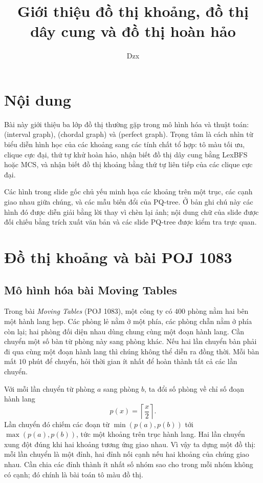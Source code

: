 \documentclass[11pt]{article}
\title{Giới thiệu đồ thị khoảng, đồ thị dây cung và đồ thị hoàn hảo}
\author{Dzx}
\date{}
\begin{document}
\maketitle


\section{Nội dung}

Bài này giới thiệu ba lớp đồ thị thường gặp trong mô hình hóa và thuật toán:
 (interval graph),  (chordal graph)
và  (perfect graph). Trọng tâm là cách nhìn từ biểu diễn
hình học của các khoảng sang các tính chất tổ hợp: tô màu tối ưu, clique cực
đại, thứ tự khử hoàn hảo, nhận biết đồ thị dây cung bằng LexBFS hoặc MCS, và
nhận biết đồ thị khoảng bằng thứ tự liên tiếp của các clique cực đại.

Các hình trong slide gốc chủ yếu minh họa các khoảng trên một trục, các cạnh
giao nhau giữa chúng, và các mẫu biến đổi của PQ-tree. Ở bản ghi chú này các
hình đó được diễn giải bằng lời thay vì chèn lại ảnh; nội dung chữ của slide
được đối chiếu bằng trích xuất văn bản và các slide PQ-tree được kiểm tra
trực quan.

\section{Đồ thị khoảng và bài POJ 1083}

\subsection{Mô hình hóa bài Moving Tables}

Trong bài \textit{Moving Tables} (POJ 1083), một công ty có $400$ phòng nằm hai
bên một hành lang hẹp. Các phòng lẻ nằm ở một phía, các phòng chẵn nằm ở phía
còn lại; hai phòng đối diện nhau dùng chung cùng một đoạn hành lang. Cần chuyển
một số bàn từ phòng này sang phòng khác. Nếu hai lần chuyển bàn phải đi qua
cùng một đoạn hành lang thì chúng không thể diễn ra đồng thời. Mỗi bàn mất
$10$ phút để chuyển, hỏi thời gian ít nhất để hoàn thành tất cả các lần chuyển.

Với mỗi lần chuyển từ phòng $a$ sang phòng $b$, ta đổi số phòng về chỉ số đoạn
hành lang
\[
  p(x)=\left\lceil \frac{x}{2}\right\rceil.
\]
Lần chuyển đó chiếm các đoạn từ $\min(p(a),p(b))$ tới $\max(p(a),p(b))$, tức
một khoảng trên trục hành lang. Hai lần chuyển xung đột đúng khi hai khoảng
tương ứng giao nhau. Vì vậy ta dựng một đồ thị: mỗi lần chuyển là một đỉnh, hai
đỉnh nối cạnh nếu hai khoảng của chúng giao nhau. Cần chia các đỉnh thành ít
nhất số nhóm sao cho trong mỗi nhóm không có cạnh; đó chính là bài toán tô màu
đồ thị.
\end{document}
